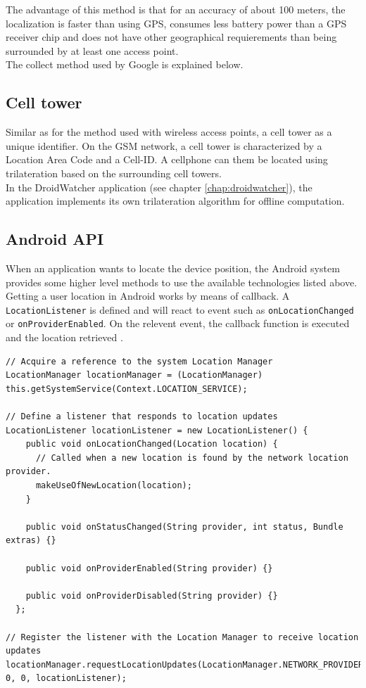 The advantage of this method is that for an accuracy of about 100 meters, the localization is faster than using GPS, consumes less battery power than a GPS receiver chip and does not have other geographical requierements than being surrounded by at least one access point.\\

The collect method used by Google is explained below.

\subsection{Cell tower}
Similar as for the method used with wireless access points, a cell tower as a unique identifier.
On the GSM network, a cell tower is characterized by a Location Area Code and a Cell-ID.
A cellphone can them be located using trilateration based on the surrounding cell towers.\\

In the DroidWatcher application (see chapter \ref{chap:droidwatcher}), the application implements its own trilateration algorithm for offline computation.

\subsection{Android API}
When an application wants to locate the device position, the Android system provides some higher level methods to use the available technologies listed above. Getting a user location in Android works by means of callback. A \texttt{LocationListener} is defined and will react to event such as \texttt{onLocationChanged} or \texttt{onProviderEnabled}. On the relevent event, the callback function is executed and the location retrieved \cite{doc-location}.

\lstset{language=Java}
\begin{lstlisting}[label=location-base,caption=Code from Android developers guide]
// Acquire a reference to the system Location Manager
LocationManager locationManager = (LocationManager) this.getSystemService(Context.LOCATION_SERVICE);

// Define a listener that responds to location updates
LocationListener locationListener = new LocationListener() {
    public void onLocationChanged(Location location) {
      // Called when a new location is found by the network location provider.
      makeUseOfNewLocation(location);
    }

    public void onStatusChanged(String provider, int status, Bundle extras) {}

    public void onProviderEnabled(String provider) {}

    public void onProviderDisabled(String provider) {}
  };

// Register the listener with the Location Manager to receive location updates
locationManager.requestLocationUpdates(LocationManager.NETWORK_PROVIDER, 0, 0, locationListener);
\end{lstlisting}
  
